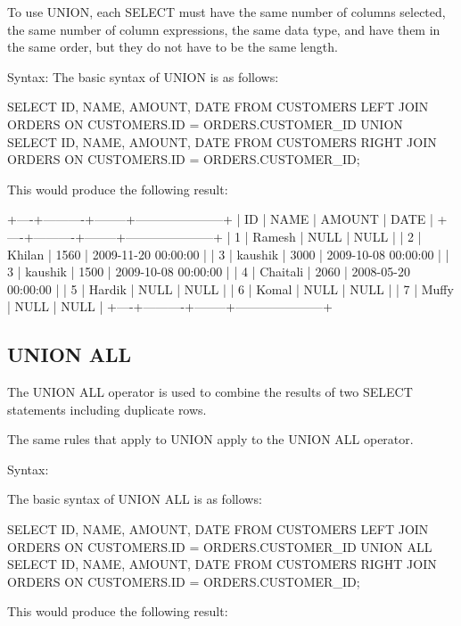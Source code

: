 To use UNION, each SELECT must have the same number of columns selected, the same number of column expressions, the same data type, and have them in the same order, but they do 
not have to be the same length.

Syntax:
The basic syntax of UNION is as follows:

\begin{Code}
	SELECT  ID, NAME, AMOUNT, DATE
	FROM CUSTOMERS
	LEFT JOIN ORDERS
	ON CUSTOMERS.ID = ORDERS.CUSTOMER_ID
	UNION
	SELECT  ID, NAME, AMOUNT, DATE
	FROM CUSTOMERS
	RIGHT JOIN ORDERS
	ON CUSTOMERS.ID = ORDERS.CUSTOMER_ID;
\end{Code}

This would produce the following result:

\begin{Code}
	+----+----------+--------+---------------------+
	| ID | NAME     | AMOUNT | DATE                |
	+----+----------+--------+---------------------+
	|  1 | Ramesh   |   NULL | NULL                |
	|  2 | Khilan   |   1560 | 2009-11-20 00:00:00 |
	|  3 | kaushik  |   3000 | 2009-10-08 00:00:00 |
	|  3 | kaushik  |   1500 | 2009-10-08 00:00:00 |
	|  4 | Chaitali |   2060 | 2008-05-20 00:00:00 |
	|  5 | Hardik   |   NULL | NULL                |
	|  6 | Komal    |   NULL | NULL                |
	|  7 | Muffy    |   NULL | NULL                |
	+----+----------+--------+---------------------+
\end{Code}

\subsection{UNION ALL}
The UNION ALL operator is used to combine the results of two SELECT statements including duplicate rows.

The same rules that apply to UNION apply to the UNION ALL operator.

Syntax:

The basic syntax of UNION ALL is as follows:


\begin{Code}
	SELECT  ID, NAME, AMOUNT, DATE
	FROM CUSTOMERS
	LEFT JOIN ORDERS
	ON CUSTOMERS.ID = ORDERS.CUSTOMER_ID
	UNION ALL
	SELECT  ID, NAME, AMOUNT, DATE
	FROM CUSTOMERS
	RIGHT JOIN ORDERS
	ON CUSTOMERS.ID = ORDERS.CUSTOMER_ID;
\end{Code}

This would produce the following result:

